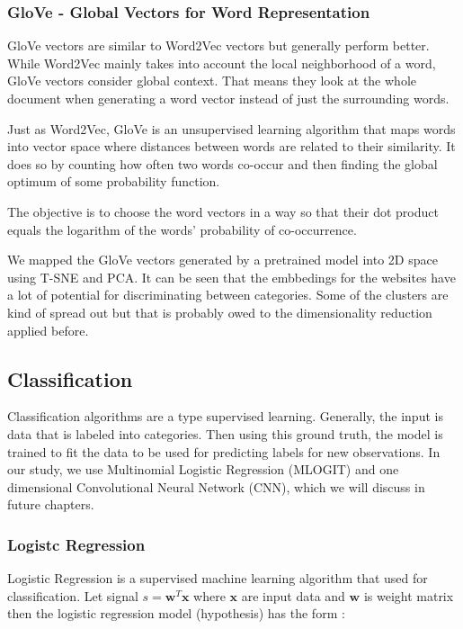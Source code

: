 \documentclass[12pt]{article}
\begin{document}
\subsubsection{GloVe - Global Vectors for Word Representation}
GloVe vectors are similar to Word2Vec vectors but generally perform better. While Word2Vec mainly takes into account the local neighborhood of a word, GloVe vectors consider global context. That means they look at the whole document when generating a word vector instead of just the surrounding words.

Just as Word2Vec, GloVe is an unsupervised learning algorithm that maps words into vector space where distances between words are related to their similarity. It does so by counting how often two words co-occur and then finding the global optimum of some probability function.

The objective is to choose the word vectors in a way so that their dot product equals the logarithm of the words' probability of co-occurrence.

We mapped the GloVe vectors generated by a pretrained model into 2D space using T-SNE and PCA. 
It can be seen that the embbedings for the websites have a lot of potential for discriminating between categories. Some of the clusters are kind of spread out but that is probably owed to the dimensionality reduction applied before.



\begin{center}
\subsection{Classification}
\end{center}

Classification algorithms are a type supervised learning. Generally, the input is data that is labeled into categories. Then using this ground truth, the model is trained to fit the data to be used for predicting labels for new observations. In our study, we use Multinomial Logistic Regression (MLOGIT) and one dimensional Convolutional Neural Network (CNN), which we will discuss in future chapters. 

\subsubsection{Logistc Regression}
Logistic Regression is a supervised machine learning algorithm that used for classification.  Let signal $s = \textbf{w}^T\textbf{x}$ where $\textbf{x}$ are input data and $\textbf{w}$ is weight matrix then the logistic regression model (hypothesis) has the form \cite{Abu-Mostafa:2012:LD:2207825}:
\end{document}
